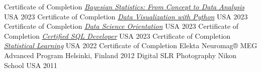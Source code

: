 


\begin{cvhonors}

  \cvhonor
    {Certificate of Completion} %
    {\href{https://www.coursera.org/account/accomplishments/certificate/DR5CTTN4HL35}{\emph{Bayesian Statistics: From Concept to Data Analysis}}} %
    {USA}
    {2023}
  \cvhonor
    {Certificate of Completion} %
    {\href{https://www.coursera.org/account/accomplishments/certificate/G4G3368QTG2N}{\emph{Data Visualization with Python}}} %
    {USA} %
    {2023} %
  \cvhonor
    {Certificate of Completion} %
    {\href{https://www.coursera.org/account/accomplishments/certificate/HM6YZKUP8J8X}{\emph{Data Science Orientation}}} %
    {USA} %
    {2023} %
  \cvhonor
    {Certificate of Completion} %
    {\href{https://verify.w3schools.com/1NDRG69DTP}{\emph{Certified SQL Developer}}} %
    {USA} %
    {2023} %
  \cvhonor
    {Certificate of Completion} %
    {\href{https://courses.edx.org/certificates/6def26e9529b4ded83ebfe2e86e7e0da}{\emph{Statistical Learning}}} %
    {USA} %
    {2022} %
  \cvhonor
    {Certificate of Completion} %
    {Elekta Neuromag® MEG Advanced Program} %
    {Helsinki, Finland} %
    {2012} %
  \cvhonor
    {Digital SLR Photography} %
    {Nikon School} %
    {USA} %
    {2011} %
\end{cvhonors}